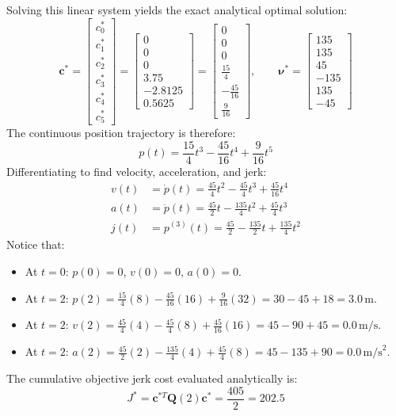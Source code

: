 \documentclass[11pt,a4paper]{article}
\begin{document}
Solving this linear system yields the exact analytical optimal solution:
\begin{equation}
\mathbf{c}^* = \begin{bmatrix}
c_0^* \\ c_1^* \\ c_2^* \\ c_3^* \\ c_4^* \\ c_5^*
\end{bmatrix}
=
\begin{bmatrix}
0 \\ 0 \\ 0 \\ 3.75 \\ -2.8125 \\ 0.5625
\end{bmatrix}
=
\begin{bmatrix}
0 \\ 0 \\ 0 \\ \frac{15}{4} \\ -\frac{45}{16} \\ \frac{9}{16}
\end{bmatrix}, \qquad
\boldsymbol{\nu}^* =
\begin{bmatrix}
135 \\ 135 \\ 45 \\ -135 \\ 135 \\ -45
\end{bmatrix}
\end{equation}
The continuous position trajectory is therefore:
\begin{equation}
p(t) = \frac{15}{4} t^3 - \frac{45}{16} t^4 + \frac{9}{16} t^5
\end{equation}
Differentiating to find velocity, acceleration, and jerk:
\begin{align}
v(t) &= \dot{p}(t) = \frac{45}{4} t^2 - \frac{45}{4} t^3 + \frac{45}{16} t^4 \\
a(t) &= \ddot{p}(t) = \frac{45}{2} t - \frac{135}{4} t^2 + \frac{45}{4} t^3 \\
j(t) &= p^{(3)}(t) = \frac{45}{2} - \frac{135}{2} t + \frac{135}{4} t^2
\end{align}
Notice that:
\begin{itemize}
    \item At $t=0$: $p(0) = 0$, $v(0) = 0$, $a(0) = 0$.
    \item At $t=2$: $p(2) = \frac{15}{4}(8) - \frac{45}{16}(16) + \frac{9}{16}(32) = 30 - 45 + 18 = 3.0\,\text{m}$.
    \item At $t=2$: $v(2) = \frac{45}{4}(4) - \frac{45}{4}(8) + \frac{45}{16}(16) = 45 - 90 + 45 = 0.0\,\text{m/s}$.
    \item At $t=2$: $a(2) = \frac{45}{2}(2) - \frac{135}{4}(4) + \frac{45}{4}(8) = 45 - 135 + 90 = 0.0\,\text{m/s}^2$.
\end{itemize}
The cumulative objective jerk cost evaluated analytically is:
\begin{equation}
J^* = \mathbf{c}^{*T} \mathbf{Q}(2) \mathbf{c}^* = \frac{405}{2} = 202.5
\end{equation}
\end{document}
